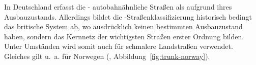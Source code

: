 \documentclass[../main/thesis.tex]{subfiles}
\begin{document}

In Deutschland erfasst die \osm- autobahnähnliche Straßen als  aufgrund ihres Ausbauzustands. \noref[wiki DE] Allerdings bildet die \osm-Straßenklassifizierung historisch bedingt das britische System ab, wo  ausdrücklich keinen bestimmten Ausbauzustand haben, sondern das Kernnetz der wichtigsten Straßen erster Ordnung bilden. \noref[wiki EN] Unter Umständen wird  somit auch für schmalere Landstraßen verwendet. Gleiches gilt u.~a. für Norwegen (, Abbildung~\ref{fig:trunk-norway}).




\end{document}
